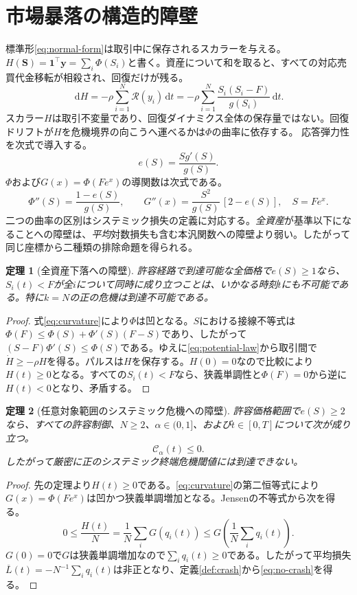 \documentclass[11pt]{article}
\numberwithin{equation}{section}
\newtheorem{theorem}{定理}[section]
\theoremstyle{definition}
\theoremstyle{remark}
\newcommand{\Cris}{\mathcal{C}}
\newcommand{\dd}{\,\mathrm{d}}
\newcommand{\one}{\mathbf{1}}
\begin{document}
\section{市場暴落の構造的障壁}\label{sec:barriers}
標準形\eqref{eq:normal-form}は取引中に保存されるスカラーを与える。$H(\bm S)=\one^\top\bm y=\sum_i\Phi(S_i)$と書く。資産について和を取ると、すべての対応売買代金移転が相殺され、回復だけが残る。
\begin{equation}\label{eq:potential-law}
\boxed{\dd H=-\rho\sum_{i=1}^N\mathcal R(y_i)\dd t
=-\rho\sum_{i=1}^N\frac{S_i(S_i-F)}{g(S_i)}\dd t.}
\end{equation}
スカラー$H$は取引不変量であり、回復ダイナミクス全体の保存量ではない。回復ドリフトが$H$を危機境界の向こうへ運べるかは$\Phi$の曲率に依存する。
応答弾力性を次式で導入する。
\begin{equation}\label{eq:elasticity}
e(S)=\frac{Sg'(S)}{g(S)}.
\end{equation}
$\Phi$および$G(x)=\Phi(Fe^x)$の導関数は次式である。
\begin{equation}\label{eq:curvature}
\Phi''(S)=\frac{1-e(S)}{g(S)},\qquad
G''(x)=\frac{S^2}{g(S)}\,[2-e(S)],\quad S=Fe^x.
\end{equation}
二つの曲率の区別はシステミック損失の定義に対応する。\emph{全資産}が基準以下になることへの障壁は、\emph{平均}対数損失も含む本汎関数への障壁より弱い。したがって同じ座標から二種類の排除命題を得られる。


\begin{theorem}[全資産下落への障壁]\label{thm:barrier1}
許容経路で到達可能な全価格で$e(S)\ge1$なら、$S_i(t)<F$が全$i$について同時に成り立つことは、いかなる時刻$t$にも不可能である。特に$k=N$の正の危機は到達不可能である。
\end{theorem}
\begin{proof}
式\eqref{eq:curvature}により$\Phi$は凹となる。$S$における接線不等式は$\Phi(F)\le\Phi(S)+\Phi'(S)(F-S)$であり、したがって$(S-F)\Phi'(S)\le\Phi(S)$である。ゆえに\eqref{eq:potential-law}から取引間で$\dot H\ge-\rho H$を得る。パルスは$H$を保存する。$H(0)=0$なので比較により$H(t)\ge0$となる。すべての$S_i(t)<F$なら、狭義単調性と$\Phi(F)=0$から逆に$H(t)<0$となり、矛盾する。
\end{proof}

\begin{theorem}[任意対象範囲のシステミック危機への障壁]\label{thm:barrier2}
許容価格範囲で$e(S)\ge2$なら、すべての許容制御、$N\ge2$、$\alpha\in(0,1]$、および$t\in[0,T]$について次が成り立つ。
\begin{equation}\label{eq:no-crash}
\boxed{\Cris_\alpha(t)\le0.}
\end{equation}
したがって厳密に正のシステミック終端危機閾値には到達できない。
\end{theorem}
\begin{proof}
先の定理より$H(t)\ge0$である。\eqref{eq:curvature}の第二恒等式により$G(x)=\Phi(Fe^x)$は凹かつ狭義単調増加となる。Jensenの不等式から次を得る。
\[
0\le\frac{H(t)}N=\frac1N\sum_iG(q_i(t))
\le G\!\left(\frac1N\sum_iq_i(t)\right).
\]
$G(0)=0$で$G$は狭義単調増加なので$\sum_iq_i(t)\ge0$である。したがって平均損失$\overline L(t)=-N^{-1}\sum_iq_i(t)$は非正となり、定義\ref{def:crash}から\eqref{eq:no-crash}を得る。
\end{proof}
\end{document}

